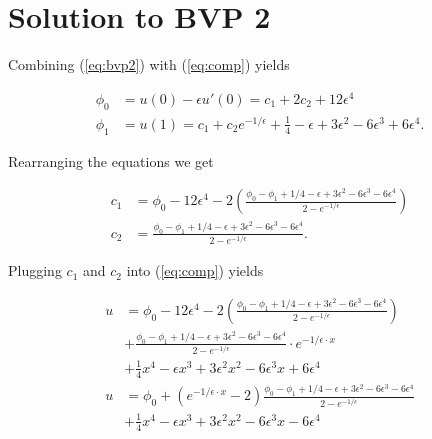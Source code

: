 \documentclass[a4paper, 12pt, reqno]{amsart}
\numberwithin{equation}{section}
\begin{document}
\section{Solution to BVP 2}

Combining (\ref{eq:bvp2}) with (\ref{eq:comp}) yields

\begin{equation}\nonumber
    \begin{aligned}
        \phi_0 &= u(0) -\epsilon u'(0) = c_1 + 2 c_2 + 12 \epsilon^4  \\
        \phi_1 &= u(1) = c_1 + c_2 e^{-1/\epsilon} + \frac{1}{4} - \epsilon 
            + 3 \epsilon^2 - 6 \epsilon^3 + 6 \epsilon^4.
    \end{aligned}
\end{equation}

Rearranging the equations we get

\begin{equation}\nonumber
    \begin{aligned}
        c_1 &= \phi_0  - 12 \epsilon^4 - 2 \left( \frac{\phi_0-\phi_1+1/4
            -\epsilon+3\epsilon^2-6\epsilon^3-6\epsilon^4}{2 - e^{-1/\epsilon}}
            \right)       \\
        c_2 &= \frac{\phi_0-\phi_1+1/4-\epsilon+3\epsilon^2-6\epsilon^3
            -6\epsilon^4}{2 - e^{-1/\epsilon}}.
    \end{aligned}
\end{equation}

Plugging $c_1$ and $c_2$ into (\ref{eq:comp}) yields

\begin{equation}\nonumber
    \begin{aligned}
    u &= \phi_0  - 12 \epsilon^4 - 2 \left( \frac{\phi_0-\phi_1+1/4
            -\epsilon+3\epsilon^2-6\epsilon^3-6\epsilon^4}{2 - e^{-1/\epsilon}}
            \right)       \\
        &+ \frac{\phi_0-\phi_1+1/4-\epsilon+3\epsilon^2-6\epsilon^3
            -6\epsilon^4}{2 - e^{-1/\epsilon}} \cdot e^{-1/\epsilon \cdot x}\\
        &+ \frac{1}{4}x^4 - \epsilon x^3 + 3\epsilon^2 x^2 
            - 6 \epsilon^3 x + 6 \epsilon^4             \\
        u &= \phi_0  + (e^{-1/\epsilon \cdot x} - 2) 
            \frac{\phi_0-\phi_1+1/4 -\epsilon+3\epsilon^2-6\epsilon^3-
            6\epsilon^4}{2 - e^{-1/\epsilon}}    \\
        &+ \frac{1}{4}x^4 - \epsilon x^3 + 3\epsilon^2 x^2 
            - 6 \epsilon^3 x - 6 \epsilon^4
    \end{aligned}
\end{equation}
\end{document}
